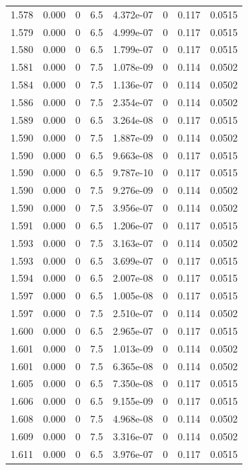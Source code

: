 \documentclass[preview]{standalone}
\begin{document}
{{{{{{{{{{{{{{{{{{\begin{tabular}{L{1.2cm}C{1.2cm} C{0.3cm}C{0.5cm} C{1.4cm}C{1.4cm} C{1.4cm}C{1.4cm}}
  1.578  &  0.000  & 0     & 6.5 &  4.372e-07  & 0  & 0.117 &  0.0515   \\ 
  1.579  &  0.000  & 0     & 6.5 &  4.999e-07  & 0  & 0.117 &  0.0515   \\ 
  1.580  &  0.000  & 0     & 6.5 &  1.799e-07  & 0  & 0.117 &  0.0515   \\ 
  1.581  &  0.000  & 0     & 7.5 &  1.078e-09  & 0  & 0.114 &  0.0502   \\ 
  1.584  &  0.000  & 0     & 7.5 &  1.136e-07  & 0  & 0.114 &  0.0502   \\ 
  1.586  &  0.000  & 0     & 7.5 &  2.354e-07  & 0  & 0.114 &  0.0502   \\ 
  1.589  &  0.000  & 0     & 6.5 &  3.264e-08  & 0  & 0.117 &  0.0515   \\ 
  1.590  &  0.000  & 0     & 7.5 &  1.887e-09  & 0  & 0.114 &  0.0502   \\ 
  1.590  &  0.000  & 0     & 6.5 &  9.663e-08  & 0  & 0.117 &  0.0515   \\ 
  1.590  &  0.000  & 0     & 6.5 &  9.787e-10  & 0  & 0.117 &  0.0515   \\ 
  1.590  &  0.000  & 0     & 7.5 &  9.276e-09  & 0  & 0.114 &  0.0502   \\ 
  1.590  &  0.000  & 0     & 7.5 &  3.956e-07  & 0  & 0.114 &  0.0502   \\ 
  1.591  &  0.000  & 0     & 6.5 &  1.206e-07  & 0  & 0.117 &  0.0515   \\ 
  1.593  &  0.000  & 0     & 7.5 &  3.163e-07  & 0  & 0.114 &  0.0502   \\ 
  1.593  &  0.000  & 0     & 6.5 &  3.699e-07  & 0  & 0.117 &  0.0515   \\ 
  1.594  &  0.000  & 0     & 6.5 &  2.007e-08  & 0  & 0.117 &  0.0515   \\ 
  1.597  &  0.000  & 0     & 6.5 &  1.005e-08  & 0  & 0.117 &  0.0515   \\ 
  1.597  &  0.000  & 0     & 7.5 &  2.510e-07  & 0  & 0.114 &  0.0502   \\ 
  1.600  &  0.000  & 0     & 6.5 &  2.965e-07  & 0  & 0.117 &  0.0515   \\ 
  1.601  &  0.000  & 0     & 7.5 &  1.013e-09  & 0  & 0.114 &  0.0502   \\ 
  1.601  &  0.000  & 0     & 7.5 &  6.365e-08  & 0  & 0.114 &  0.0502   \\ 
  1.605  &  0.000  & 0     & 6.5 &  7.350e-08  & 0  & 0.117 &  0.0515   \\ 
  1.606  &  0.000  & 0     & 6.5 &  9.155e-09  & 0  & 0.117 &  0.0515   \\ 
  1.608  &  0.000  & 0     & 7.5 &  4.968e-08  & 0  & 0.114 &  0.0502   \\ 
  1.609  &  0.000  & 0     & 7.5 &  3.316e-07  & 0  & 0.114 &  0.0502   \\ 
  1.611  &  0.000  & 0     & 6.5 &  3.976e-07  & 0  & 0.117 &  0.0515   \\ 
\hline 
\end{tabular} 

}}}}}}}}}}}}}}}}}}
\end{document}
